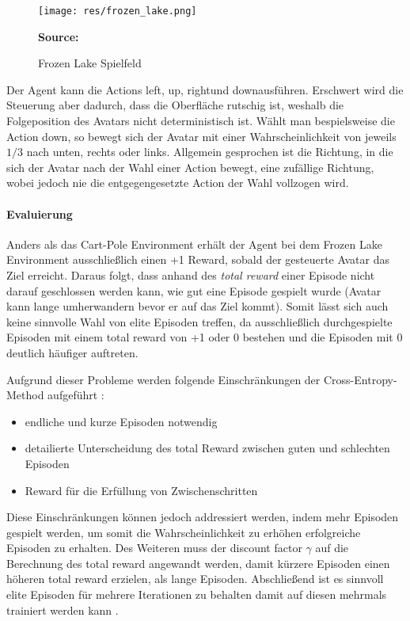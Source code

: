 \documentclass[11pt]{scrartcl}
\newcommand{\source}[1]{\vspace{-5pt} \caption*{\hfill \textbf{Source:} {#1}} }
\begin{document}
\begin{figure}[htp]
\centering
\texttt{[image: res/frozen\_lake.png]}
\caption{Frozen Lake Spielfeld}
\source{\cite[~S.90 - Chapter 4 - Figure 5]{L2018}}
\label{fig:frozen_lake}
\end{figure}

\noindent
Der Agent kann die Actions \grqq left\grqq, \grqq up\grqq, \grqq right\grqq und \grqq
down\grqq ausführen. Erschwert wird die Steuerung aber dadurch, dass die Oberfläche
rutschig ist, weshalb die Folgeposition des Avatars nicht deterministisch ist.
Wählt man bespielsweise die Action \grqq down\grqq, so bewegt sich der Avatar mit einer
Wahrscheinlichkeit von jeweils $1/3$ nach unten, rechts oder links. Allgemein gesprochen
ist die Richtung, in die sich der Avatar nach der Wahl einer Action bewegt, eine zufällige
Richtung, wobei jedoch nie die entgegengesetzte Action der Wahl vollzogen wird.


\paragraph*{Evaluierung}
\noindent
\newline
Anders als das Cart-Pole Environment erhält der Agent bei dem Frozen Lake Environment 
ausschließlich einen +1 Reward, sobald der gesteuerte Avatar das Ziel erreicht. Daraus folgt,
dass anhand des \textit{total reward} einer Episode nicht darauf geschlossen werden kann,
wie gut eine Episode gespielt wurde (Avatar kann lange umherwandern bevor er auf das Ziel kommt).
Somit lässt sich auch keine sinnvolle Wahl von elite Episoden treffen, da ausschließlich
durchgespielte Episoden mit einem total reward von +1 oder 0 bestehen und die Episoden mit 0
deutlich häufiger auftreten.

Aufgrund dieser Probleme werden folgende Einschränkungen der Cross-Entropy-Method 
aufgeführt \cite[~S.92 f.]{L2018}:
\begin{itemize}
\itemsep0pt
\item endliche und kurze Episoden notwendig
\item detailierte Unterscheidung des total Reward zwischen guten und schlechten Episoden
\item Reward für die Erfüllung von Zwischenschritten
  \label{itm:cross_entropy_limits}
\end{itemize}

Diese Einschränkungen können jedoch addressiert werden, indem mehr Episoden gespielt werden, 
um somit die Wahrscheinlichkeit zu erhöhen erfolgreiche Episoden zu erhalten. Des Weiteren
muss der discount factor $\gamma$ auf die Berechnung des total reward angewandt werden, damit
kürzere Episoden einen höheren total reward erzielen, als lange Episoden. Abschließend ist es
sinnvoll elite Episoden für mehrere Iterationen zu behalten damit auf diesen mehrmals
trainiert werden kann \cite[~S.93]{L2018}.  
\end{document}
